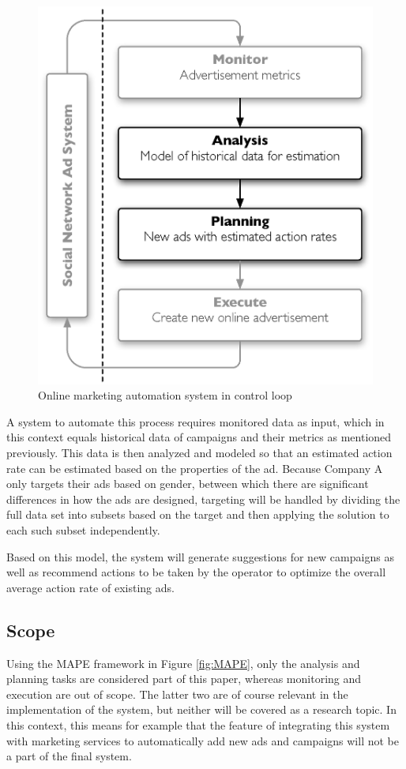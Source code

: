 \documentclass{sig-alternate}
\begin{document}
\begin{figure}[htb] \centering \includegraphics[width=\columnwidth]{mape-marketing.eps}
	\caption{Online marketing automation system in control loop}
	\label{fig:MAPEMarketing}
\end{figure}

A system to automate this process requires monitored data as input, which in this context equals historical data of campaigns and their metrics as mentioned previously. This data is then analyzed and modeled so that an estimated action rate can be estimated based on the properties of the ad. Because Company A only targets their ads based on gender, between which there are significant differences in how the ads are designed, targeting will be handled by dividing the full data set into subsets based on the target and then applying the solution to each such subset independently.

Based on this model, the system will generate suggestions for new campaigns as well as recommend actions to be taken by the operator to optimize the overall average action rate of existing ads.

\subsection{Scope}
Using the MAPE framework in Figure \ref{fig:MAPE}, only the analysis and planning tasks are considered part of this paper, whereas monitoring and execution are out of scope. The latter two are of course relevant in the implementation of the system, but neither will be covered as a research topic. In this context, this means for example that the feature of integrating this system with marketing services to automatically add new ads and campaigns will not be a part of the final system.
\end{document}
